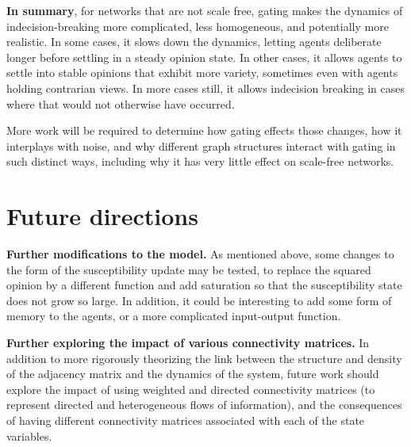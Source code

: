 \documentclass[]{article}
\begin{document}
\textbf{In summary}, for networks that are not scale free, gating makes the dynamics of indecision-breaking more complicated, less homogeneous, and potentially more realistic. In some cases, it slows down the dynamics, letting agents deliberate longer before settling in a steady opinion state. In other cases, it allows agents to settle into stable opinions that exhibit more variety, sometimes even with agents holding contrarian views. In more cases still, it allows indecision breaking in cases where that would not otherwise have occurred.

More work will be required to determine how gating effects those changes, how it interplays with noise, and why different graph structures interact with gating in such distinct ways, including why it has very little effect on scale-free networks. 

\newpage

\section{Future directions}

\textbf{Further modifications to the model.} As mentioned above, some changes to the form of the susceptibility update may be tested, to replace the squared opinion by a different function and add saturation so that the susceptibility state does not grow so large. In addition, it could be interesting to add some form of memory to the agents, or a more complicated input-output function.

\textbf{Further exploring the impact of various connectivity matrices.} In addition to more rigorously theorizing the link between the structure and density of the adjacency matrix and the dynamics of the system, future work should explore the impact of using weighted and directed connectivity matrices (to represent directed and heterogeneous flows of information), and the consequences of having different connectivity matrices associated with each of the state variables.
\end{document}
